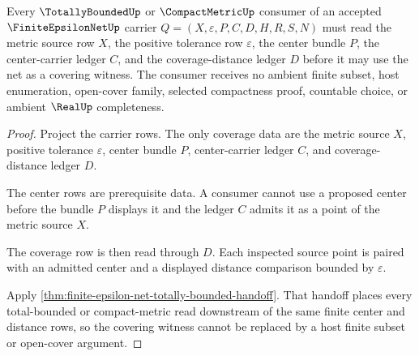 \begin{theorem}
\label{thm:finite-epsilon-net-obligation-coverage}
Every $\TotallyBoundedUp$ or $\CompactMetricUp$ consumer of an accepted $\FiniteEpsilonNetUp$ carrier $Q=(X,\varepsilon,P,C,D,H,R,S,N)$ must read the metric source row $X$, the positive tolerance row $\varepsilon$, the center bundle $P$, the center-carrier ledger $C$, and the coverage-distance ledger $D$ before it may use the net as a covering witness. The consumer receives no ambient finite subset, host enumeration, open-cover family, selected compactness proof, countable choice, or ambient $\RealUp$ completeness.
\end{theorem}
\begin{proof}
Project the carrier rows. The only coverage data are the metric source $X$, positive tolerance $\varepsilon$, center bundle $P$, center-carrier ledger $C$, and coverage-distance ledger $D$.

The center rows are prerequisite data. A consumer cannot use a proposed center before the bundle $P$ displays it and the ledger $C$ admits it as a point of the metric source $X$.

The coverage row is then read through $D$. Each inspected source point is paired with an admitted center and a displayed distance comparison bounded by $\varepsilon$.

Apply \autoref{thm:finite-epsilon-net-totally-bounded-handoff}. That handoff places every total-bounded or compact-metric read downstream of the same finite center and distance rows, so the covering witness cannot be replaced by a host finite subset or open-cover argument.
\end{proof}

